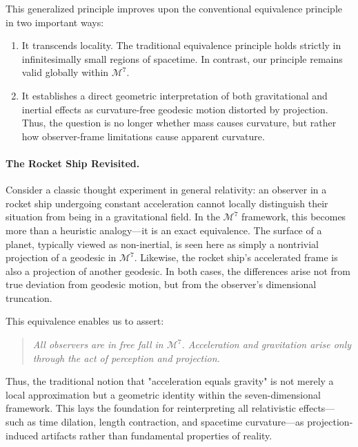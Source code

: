 \documentclass{article}
\begin{document}
This generalized principle improves upon the conventional equivalence principle in two important ways:

\begin{enumerate}
  \item It transcends locality. The traditional equivalence principle holds strictly in infinitesimally small regions of spacetime. In contrast, our principle remains valid globally within $\mathcal{M}^7$.
  \item It establishes a direct geometric interpretation of both gravitational and inertial effects as curvature-free geodesic motion distorted by projection. Thus, the question is no longer whether mass causes curvature, but rather how observer-frame limitations cause apparent curvature.
\end{enumerate}

\paragraph{The Rocket Ship Revisited.} 
Consider a classic thought experiment in general relativity: an observer in a rocket ship undergoing constant acceleration cannot locally distinguish their situation from being in a gravitational field. In the $\mathcal{M}^7$ framework, this becomes more than a heuristic analogy—it is an exact equivalence. The surface of a planet, typically viewed as non-inertial, is seen here as simply a nontrivial projection of a geodesic in $\mathcal{M}^7$. Likewise, the rocket ship's accelerated frame is also a projection of another geodesic. In both cases, the differences arise not from true deviation from geodesic motion, but from the observer's dimensional truncation.

This equivalence enables us to assert:

\begin{quote}
\emph{All observers are in free fall in $\mathcal{M}^7$. Acceleration and gravitation arise only through the act of perception and projection.}
\end{quote}

Thus, the traditional notion that "acceleration equals gravity" is not merely a local approximation but a geometric identity within the seven-dimensional framework. This lays the foundation for reinterpreting all relativistic effects—such as time dilation, length contraction, and spacetime curvature—as projection-induced artifacts rather than fundamental properties of reality.
\end{document}
